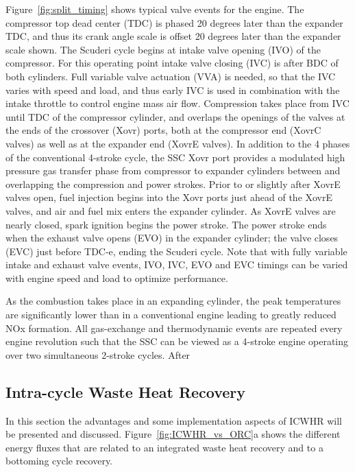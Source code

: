 Figure~\ref{fig:split_timing} shows typical valve events for the engine. The compressor top dead center (TDC) is phased 20 degrees later than the expander TDC, and thus its crank angle scale is offset 20 degrees later than the expander scale shown. The Scuderi cycle begins at intake valve opening (IVO) of the compressor. For this operating point intake valve closing (IVC) is after BDC of both cylinders. Full variable valve actuation (VVA) is needed, so that the IVC varies with speed and load, and thus early IVC is used in combination with the intake throttle to control engine mass air flow. Compression takes place from IVC until TDC of the compressor cylinder, and overlaps the openings of the valves at the ends of the crossover (Xovr) ports, both at the compressor end (XovrC valves) as well as at the expander end (XovrE valves). In addition to the 4 phases of the conventional 4-stroke cycle, the SSC Xovr port provides a modulated high pressure gas transfer phase from compressor to expander cylinders between and overlapping the compression and power strokes. Prior to or slightly after XovrE valves open, fuel injection begins into the Xovr ports just ahead of the XovrE valves, and air and fuel mix enters the expander cylinder. As XovrE valves are nearly closed, spark ignition begins the power stroke. The power stroke ends when the exhaust valve opens (EVO) in the expander cylinder; the valve closes (EVC) just before TDC-e, ending the Scuderi cycle. Note that with fully variable intake and exhaust valve events, IVO, IVC, EVO and EVC timings can be varied with engine speed and load to optimize performance.

As the combustion takes place in an expanding cylinder, the peak temperatures are significantly lower than in a conventional engine leading to greatly reduced NOx formation. All gas-exchange and thermodynamic events are repeated every engine revolution such that the SSC can be viewed as a 4-stroke engine operating over two simultaneous 2-stroke cycles.
After

\subsection{Intra-cycle Waste Heat Recovery}

In this section the advantages and some implementation aspects of ICWHR will be presented and discussed. Figure~\ref{fig:ICWHR_vs_ORC}a shows the different energy fluxes that are related to an integrated waste heat recovery and to a bottoming cycle recovery.

